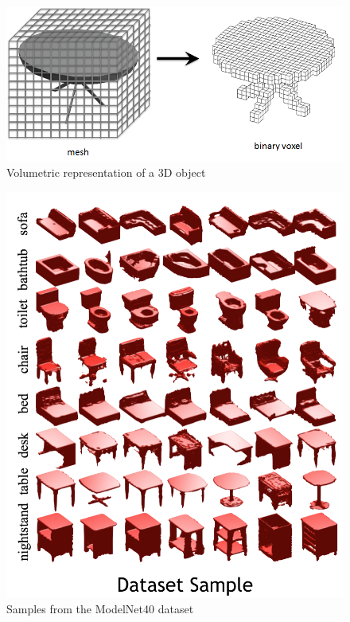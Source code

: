 \documentclass[10pt,twocolumn,letterpaper]{article}
\begin{document}
\begin{figure}[t] 
\begin{center}
	\includegraphics[width=\linewidth]{Voxel.png}
\end{center}
   \caption{Volumetric representation of a 3D object ~\cite{Authors14}}
\label{voxel}
\end{figure}

\begin{figure}[t] 
\begin{center}
	\includegraphics[width=\linewidth]{dataset_sample.png}
\end{center}
   \caption{Samples from the ModelNet40 dataset}
\label{dataset_sample}
\end{figure}
\end{document}
